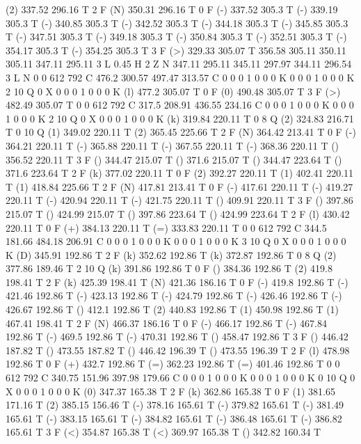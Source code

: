 (2) 337.52 296.16 T
2 F
(N) 350.31 296.16 T
0 F
(-) 337.52 305.3 T
(-) 339.19 305.3 T
(-) 340.85 305.3 T
(-) 342.52 305.3 T
(-) 344.18 305.3 T
(-) 345.85 305.3 T
(-) 347.51 305.3 T
(-) 349.18 305.3 T
(-) 350.84 305.3 T
(-) 352.51 305.3 T
(-) 354.17 305.3 T
(-) 354.25 305.3 T
3 F
(>) 329.33 305.07 T
356.58 305.11 350.11 305.11 347.11 295.11 3 L
0.45 H
2 Z
N
347.11 295.11 345.11 297.97 344.11 296.54 3 L
N
0 0 612 792 C
476.2 300.57 497.47 313.57 C
0 0 0 1 0 0 0 K
0 0 0 1 0 0 0 K
2 10 Q
0 X
0 0 0 1 0 0 0 K
(l) 477.2 305.07 T
0 F
(0) 490.48 305.07 T
3 F
(>) 482.49 305.07 T
0 0 612 792 C
317.5 208.91 436.55 234.16 C
0 0 0 1 0 0 0 K
0 0 0 1 0 0 0 K
2 10 Q
0 X
0 0 0 1 0 0 0 K
(k) 319.84 220.11 T
0 8 Q
(2) 324.83 216.71 T
0 10 Q
(1) 349.02 220.11 T
(2) 365.45 225.66 T
2 F
(N) 364.42 213.41 T
0 F
(-) 364.21 220.11 T
(-) 365.88 220.11 T
(-) 367.55 220.11 T
(-) 368.36 220.11 T
() 356.52 220.11 T
3 F
() 344.47 215.07 T
() 371.6 215.07 T
() 344.47 223.64 T
() 371.6 223.64 T
2 F
(k) 377.02 220.11 T
0 F
(2) 392.27 220.11 T
(1) 402.41 220.11 T
(1) 418.84 225.66 T
2 F
(N) 417.81 213.41 T
0 F
(-) 417.61 220.11 T
(-) 419.27 220.11 T
(-) 420.94 220.11 T
(-) 421.75 220.11 T
() 409.91 220.11 T
3 F
() 397.86 215.07 T
() 424.99 215.07 T
() 397.86 223.64 T
() 424.99 223.64 T
2 F
(l) 430.42 220.11 T
0 F
(+) 384.13 220.11 T
(=) 333.83 220.11 T
0 0 612 792 C
344.5 181.66 484.18 206.91 C
0 0 0 1 0 0 0 K
0 0 0 1 0 0 0 K
3 10 Q
0 X
0 0 0 1 0 0 0 K
(D) 345.91 192.86 T
2 F
(k) 352.62 192.86 T
(k) 372.87 192.86 T
0 8 Q
(2) 377.86 189.46 T
2 10 Q
(k) 391.86 192.86 T
0 F
() 384.36 192.86 T
(2) 419.8 198.41 T
2 F
(k) 425.39 198.41 T
(N) 421.36 186.16 T
0 F
(-) 419.8 192.86 T
(-) 421.46 192.86 T
(-) 423.13 192.86 T
(-) 424.79 192.86 T
(-) 426.46 192.86 T
(-) 426.67 192.86 T
() 412.1 192.86 T
(2) 440.83 192.86 T
(1) 450.98 192.86 T
(1) 467.41 198.41 T
2 F
(N) 466.37 186.16 T
0 F
(-) 466.17 192.86 T
(-) 467.84 192.86 T
(-) 469.5 192.86 T
(-) 470.31 192.86 T
() 458.47 192.86 T
3 F
() 446.42 187.82 T
() 473.55 187.82 T
() 446.42 196.39 T
() 473.55 196.39 T
2 F
(l) 478.98 192.86 T
0 F
(+) 432.7 192.86 T
(=) 362.23 192.86 T
(=) 401.46 192.86 T
0 0 612 792 C
340.75 151.96 397.98 179.66 C
0 0 0 1 0 0 0 K
0 0 0 1 0 0 0 K
0 10 Q
0 X
0 0 0 1 0 0 0 K
(0) 347.37 165.38 T
2 F
(k) 362.86 165.38 T
0 F
(1) 381.65 171.16 T
(2) 385.15 156.46 T
(-) 378.16 165.61 T
(-) 379.82 165.61 T
(-) 381.49 165.61 T
(-) 383.15 165.61 T
(-) 384.82 165.61 T
(-) 386.48 165.61 T
(-) 386.82 165.61 T
3 F
(<) 354.87 165.38 T
(<) 369.97 165.38 T
() 342.82 160.34 T
